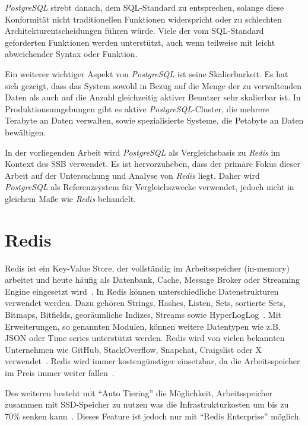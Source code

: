 \emph{PostgreSQL} strebt danach, dem SQL-Standard zu entsprechen, solange diese Konformität nicht traditionellen Funktionen widerspricht oder zu schlechten Architekturentscheidungen führen würde. Viele der vom SQL-Standard geforderten Funktionen werden unterstützt, auch wenn teilweise mit leicht abweichender Syntax oder Funktion.

Ein weiterer wichtiger Aspekt von \emph{PostgreSQL} ist seine Skalierbarkeit. Es hat sich gezeigt, dass das System sowohl in Bezug auf die Menge der zu verwaltenden Daten als auch auf die Anzahl gleichzeitig aktiver Benutzer sehr skalierbar ist. In Produktionsumgebungen gibt es aktive \emph{PostgreSQL}-Cluster, die mehrere Terabyte an Daten verwalten, sowie spezialisierte Systeme, die Petabyte an Daten bewältigen.

In der vorliegenden Arbeit wird \emph{PostgreSQL} als Vergleichsbasis zu \emph{Redis} im Kontext des \ac{SSB} verwendet. Es ist hervorzuheben, dass der primäre Fokus dieser Arbeit auf der Untersuchung und Analyse von \emph{Redis} liegt. Daher wird \emph{PostgreSQL} als Referenzsystem für Vergleichszwecke verwendet, jedoch nicht in gleichem Maße wie \emph{Redis} behandelt.

\section{Redis}

Redis ist ein Key-Value Store, der vollständig im Arbeitsspeicher (in-memory) arbeitet und heute häufig als Datenbank, Cache, Message Broker oder Streaming Engine eingesetzt wird~\cite{redis_ltd_introduction_nodate}.
In Redis können unterschiedliche Datenstrukturen verwendet werden. Dazu gehören Strings, Hashes, Listen, Sets, sortierte Sets, Bitmaps, Bitfields, georäumliche Indizes, Streams sowie HyperLogLog~\cite{redis_ltd_data_nodate}.
Mit Erweiterungen, so genannten Modulen, können weitere Datentypen wie z.B. JSON oder Time series unterstützt werden.
Redis wird von vielen bekannten Unternehmen wie GitHub, StackOverflow, Snapchat, Craigslist oder X verwendet~\cite{redis_ltd_whos_nodate}.
Redis wird immer kostengünstiger einsetzbar, da die Arbeitsspeicher im Preis immer weiter fallen~\cite{bergai_trends_2020}.

Des weiteren besteht mit \enquote{Auto Tiering} die Möglichkeit, Arbeitsspeicher zusammen mit SSD-Speicher zu nutzen was die Infrastrukturkosten um bis zu 70\% senken kann~\cite{redis_ltd_auto_nodate}. Dieses Feature ist jedoch nur mit \enquote{Redis Enterprise} möglich.


